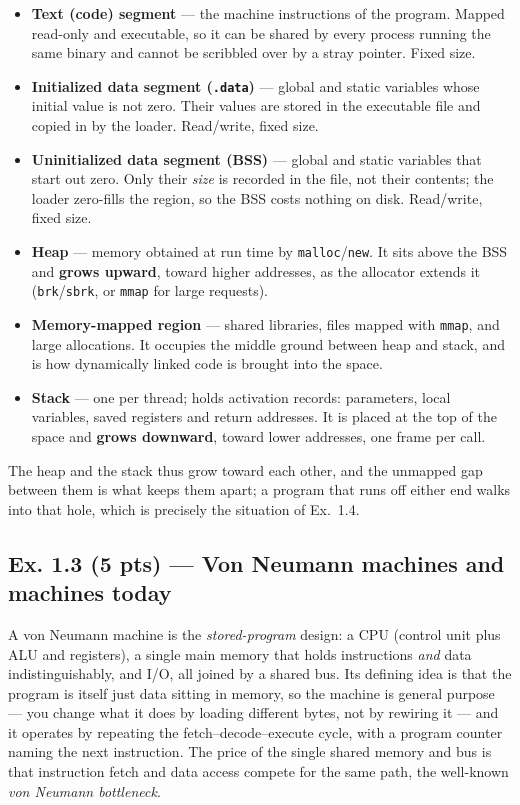 \begin{itemize}[nosep,leftmargin=1.4em,label=$\bullet$]
  \item \textbf{Text (code) segment} --- the machine instructions of the program. Mapped
        read-only and executable, so it can be shared by every process running the same
        binary and cannot be scribbled over by a stray pointer. Fixed size.
  \item \textbf{Initialized data segment (\texttt{.data})} --- global and static variables
        whose initial value is not zero. Their values are stored in the executable file
        and copied in by the loader. Read/write, fixed size.
  \item \textbf{Uninitialized data segment (BSS)} --- global and static variables that
        start out zero. Only their \emph{size} is recorded in the file, not their
        contents; the loader zero-fills the region, so the BSS costs nothing on disk.
        Read/write, fixed size.
  \item \textbf{Heap} --- memory obtained at run time by \texttt{malloc}/\texttt{new}.
        It sits above the BSS and \textbf{grows upward}, toward higher addresses, as the
        allocator extends it (\texttt{brk}/\texttt{sbrk}, or \texttt{mmap} for large
        requests).
  \item \textbf{Memory-mapped region} --- shared libraries, files mapped with
        \texttt{mmap}, and large allocations. It occupies the middle ground between heap
        and stack, and is how dynamically linked code is brought into the space.
  \item \textbf{Stack} --- one per thread; holds activation records: parameters, local
        variables, saved registers and return addresses. It is placed at the top of the
        space and \textbf{grows downward}, toward lower addresses, one frame per call.
\end{itemize}

The heap and the stack thus grow toward each other, and the unmapped gap between them is
what keeps them apart; a program that runs off either end walks into that hole, which is
precisely the situation of Ex.~1.4.

\subsection*{Ex. 1.3 (5 pts) --- Von Neumann machines and machines today}
\label{p1:sec:vonneumann}

A von Neumann machine is the \emph{stored-program} design: a CPU (control unit plus ALU
and registers), a single main memory that holds instructions \emph{and} data
indistinguishably, and I/O, all joined by a shared bus. Its defining idea is that the
program is itself just data sitting in memory, so the machine is general purpose --- you
change what it does by loading different bytes, not by rewiring it --- and it operates by
repeating the fetch--decode--execute cycle, with a program counter naming the next
instruction. The price of the single shared memory and bus is that instruction fetch and
data access compete for the same path, the well-known \emph{von Neumann bottleneck}.

